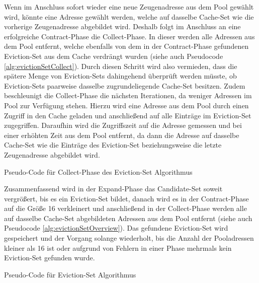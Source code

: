 Wenn im Anschluss sofort wieder eine neue Zeugenadresse aus dem Pool gewählt wird, könnte eine Adresse gewählt werden, welche auf dasselbe Cache-Set wie die vorherige Zeugenadresse abgebildet wird.
Deshalb folgt im Anschluss an eine erfolgreiche Contract-Phase die Collect-Phase.
In dieser werden alle Adressen aus dem Pool entfernt, welche ebenfalls von dem in der Contract-Phase gefundenen Eviction-Set aus dem Cache verdrängt wurden (siehe auch Pseudocode \ref{alg:evictionSetCollect}).
Durch diesen Schritt wird also vermieden, dass die spätere Menge von Eviction-Sets dahingehend überprüft werden müsste, ob Eviction-Sets paarweise dasselbe zugrundeliegende Cache-Set besitzen. 
Zudem beschleunigt die Collect-Phase die nächsten Iterationen, da weniger Adressen im Pool zur Verfügung stehen.
Hierzu wird eine Adresse aus dem Pool durch einen Zugriff in den Cache geladen und anschließend auf alle Einträge im Eviction-Set zugegriffen.
Daraufhin wird die Zugriffszeit auf die Adresse gemessen und bei einer erhöhten Zeit aus dem Pool entfernt, da dann die Adresse auf dasselbe Cache-Set wie die Einträge des Eviction-Set beziehungsweise die letzte Zeugenadresse abgebildet wird.

\begin{algorithm}[h]
\DontPrintSemicolon
\caption{Pseudo-Code für Collect-Phase des Eviction-Set Algorithmus}
\label{alg:evictionSetCollect}

\end{algorithm}

Zusammenfassend wird in der Expand-Phase das Candidate-Set soweit vergrößert, bis es ein Eviction-Set bildet, danach wird es in der Contract-Phase auf die Größe 16 verkleinert und anschließend in der Collect-Phase werden alle auf dasselbe Cache-Set abgebildeten Adressen aus dem Pool entfernt (siehe auch Pseudocode \ref{alg:evictionSetOverview}).
Das gefundene Eviction-Set wird gespeichert und der Vorgang solange wiederholt, bis die Anzahl der Pooladressen kleiner als 16 ist oder aufgrund von Fehlern in einer Phase mehrmals kein Eviction-Set gefunden wurde.

\begin{algorithm}[h]
\DontPrintSemicolon
\caption{Pseudo-Code für Eviction-Set Algorithmus}
\label{alg:evictionSetOverview}

\end{algorithm}

